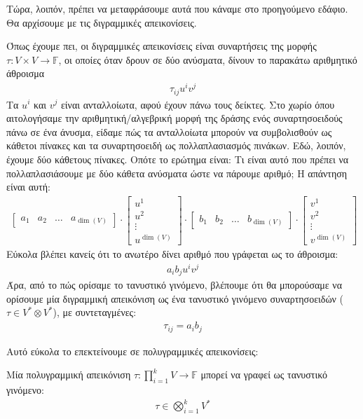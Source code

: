 \documentclass[main.tex]{subfiles}
\begin{document}
 	Τώρα, λοιπόν, πρέπει να μεταφράσουμε αυτά που κάναμε στο προηγούμενο εδάφιο. Θα αρχίσουμε με τις διγραμμικές απεικονίσεις.
 	
 	Όπως έχουμε πει, οι διγραμμικές απεικονίσεις είναι συναρτήσεις της μορφής $\tau:V\times V\rightarrow\mathbb{F}$, οι οποίες όταν δρουν σε δύο ανύσματα, δίνουν το παρακάτω αριθμητικό άθροισμα
 	\begin{align*}
 		\tau_{ij}u^iv^j
 	\end{align*}
 	Τα $u^i$ και $v^j$ είναι ανταλλοίωτα, αφού έχουν πάνω τους δείκτες. Στο χωρίο όπου αιτολογήσαμε την αριθμητική/αλγεβρική μορφή της δράσης ενός συναρτησοειδούς πάνω σε ένα άνυσμα, είδαμε πώς τα ανταλλοίωτα μπορούν να συμβολισθούν ως κάθετοι πίνακες και τα συναρτησοειδή ως πολλαπλασιασμός πινάκων. Εδώ, λοιπόν, έχουμε δύο κάθετους πίνακες. Οπότε το ερώτημα είναι: Τι είναι αυτό που πρέπει να πολλαπλασιάσουμε με δύο κάθετα ανύσματα ώστε να πάρουμε αριθμό; Η απάντηση είναι αυτή:
 	\begin{align*}
 		\begin{bmatrix}
 			a_1 & a_2 & \ldots & a_{\dim(V)}
 		\end{bmatrix} \cdot
 		\begin{bmatrix}
 			u^1 \\
 			u^2 \\
 			\vdots \\
 			u^{\dim(V)}
 		\end{bmatrix} \cdot 
 		\begin{bmatrix}
 			b_1 & b_2 & \ldots & b_{\dim(V)}
 		\end{bmatrix} \cdot
 		\begin{bmatrix}
 			v^1 \\
 			v^2 \\
 			\vdots \\
 			v^{\dim(V)}
 		\end{bmatrix}
 	\end{align*}
 	Εύκολα βλέπει κανείς ότι το ανωτέρο δίνει αριθμό που γράφεται ως το άθροισμα:
 	\begin{align*}
 		a_ib_ju^iv^j
 	\end{align*}
	Άρα, από το πώς ορίσαμε το τανυστικό γινόμενο, βλέπουμε ότι θα μπορούσαμε να ορίσουμε μία διγραμμική απεικόνιση ως ένα τανυστικό γινόμενο συναρτησοειδών ($\tau \in V^*\otimes V^*$), με συντεταγμένες:
	\begin{align*}
		\tau_{ij} = a_ib_j
	\end{align*}
 	
 	Αυτό εύκολα το επεκτείνουμε σε πολυγραμμικές απεικονίσεις:
 	\begin{corollary}
 		Μία πολυγραμμική απεικόνιση ${\tau:\prod_{i=1}^{k}V\rightarrow\mathbb{F}}$ μπορεί να γραφεί ως τανυστικό γινόμενο:
 		\begin{align*}
 			\tau \in \bigotimes_{i=1}^{k}V^*
 		\end{align*}
 	\end{corollary}
 
\end{document}
